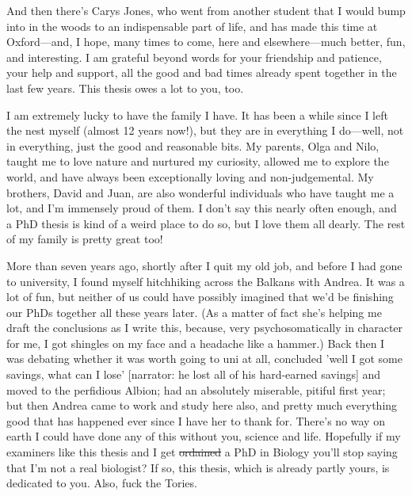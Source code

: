 And then there's Carys Jones, who went from another student that I would bump into in the woods to an indispensable part of life, and has made this time at Oxford---and, I hope, many times to come, here and elsewhere---much better, fun, and interesting. I am grateful beyond words for your friendship and patience, your help and support, all the good and bad times already spent together in the last few years. This thesis owes a lot to you, too.

I am extremely lucky to have the family I have. It has been a while since I left the nest myself (almost 12 years now!), but they are in everything I do---well, not in everything, just the good and reasonable bits. My parents, Olga and Nilo, taught me to love nature and nurtured my curiosity, allowed me to explore the world, and have always been exceptionally loving and non-judgemental. My brothers, David and Juan, are also wonderful individuals who have taught me a lot, and I'm immensely proud of them. I don't say this nearly often enough, and a PhD thesis is kind of a weird place to do so, but I love them all dearly. The rest of my family is pretty great too!

More than seven years ago, shortly after I quit my old job, and before I had gone to university, I found myself hitchhiking across the Balkans with Andrea. It was a lot of fun, but neither of us could have possibly imagined that we'd be finishing our PhDs together all these years later. (As a matter of fact she's helping me draft the conclusions as I write this, because, very psychosomatically in character for me, I got shingles on my face and a headache like a hammer.) Back then I was debating whether it was worth going to uni at all, concluded 'well I got some savings, what can I lose' [narrator: he lost all of his hard-earned savings] and moved to the perfidious Albion; had an absolutely miserable, pitiful first year; but then Andrea came to work and study here also, and pretty much everything good that has happened ever since I have her to thank for. There's no way on earth I could have done any of this without you, science and life. Hopefully if my examiners like this thesis and I get \sout{ordained} a PhD in Biology you'll stop saying that I'm not a real biologist? If so, this thesis, which is already partly yours, is dedicated to you. Also, fuck the Tories.
